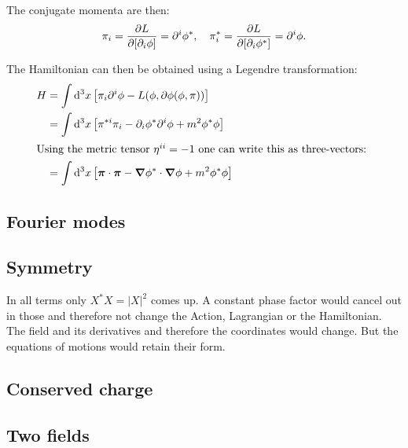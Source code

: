 \documentclass[11pt, ngerman, fleqn, DIV=15, headinclude, BCOR=1cm]{scrartcl}
\begin{document}
The conjugate momenta are then:
\[
    \pi_i = \frac{\partial {L}}{\partial {[\partial_i \phi]}} = \partial^i \phi^*
    ,\quad
    \pi_i^* = \frac{\partial {L}}{\partial {[\partial_i \phi^*]}} = \partial^i \phi.
\]


The Hamiltonian can then be obtained using a Legendre transformation:
\begin{align*}
    H
    &= \int \dif^3 x \sbr{\pi_i \partial^i \phi - L(\phi, \partial \phi(\phi,
\pi))} \\
    &= \int \dif^3 x \sbr{\pi^{*i} \pi_i - \partial_i \phi^* \partial^i \phi +
m^2 \phi^* \phi} \\
    \intertext{%
        Using the metric tensor $\eta^{ii} = -1$ one can write this as
        three-vectors:
    }
    &= \int \dif^3 x \sbr{\vec\pi \cdot \vec\pi - \vnabla \phi^* \cdot
\vnabla \phi + m^2 \phi^* \phi} \\
\end{align*}

\subsection{Fourier modes}

\subsection{Symmetry}

In all terms only $X^*X = |X|^2$ comes up. A constant phase factor would cancel
out in those and therefore not change the Action, Lagrangian or the
Hamiltonian. The field and its derivatives and therefore the coordinates would
change. But the equations of motions would retain their form.

\subsection{Conserved charge}

\subsection{Two fields}
\end{document}
